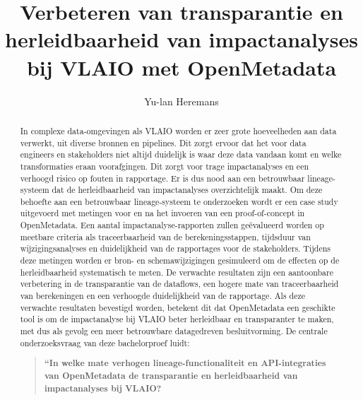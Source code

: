 \documentclass{hogent-article}
\title{Verbeteren van transparantie en herleidbaarheid van impactanalyses bij VLAIO met OpenMetadata}
\author{Yu-lan Heremans}
\begin{document}
\begin{abstract}
In complexe data-omgevingen als VLAIO worden er zeer grote hoeveelheden aan data verwerkt, uit diverse bronnen en pipelines. Dit zorgt ervoor dat het voor data engineers en stakeholders niet altijd duidelijk is waar deze data vandaan komt en welke transformaties eraan voorafgingen. Dit zorgt voor trage impactanalyses en een verhoogd risico op fouten in rapportage. Er is dus nood aan een betrouwbaar lineage-systeem dat de herleidbaarheid van impactanalyses overzichtelijk maakt. 
Om deze behoefte aan een betrouwbaar lineage-systeem te onderzoeken wordt er een case study uitgevoerd met metingen voor en na het invoeren van een proof-of-concept in OpenMetadata. Een aantal impactanalyse-rapporten zullen geëvalueerd worden op meetbare criteria als traceerbaarheid van de berekeningsstappen, tijdsduur van wijzigingsanalyses en duidelijkheid van de rapportages voor de stakeholders. Tijdens deze metingen worden er bron- en schemawijzigingen gesimuleerd om de effecten op de herleidbaarheid systematisch te meten.
De verwachte resultaten zijn een aantoonbare verbetering in de transparantie van de dataflows, een hogere mate van traceerbaarheid van berekeningen en een verhoogde duidelijkheid van de rapportage.
Als deze verwachte resultaten bevestigd worden, betekent dit dat OpenMetadata een geschikte tool is om de impactanalyse bij VLAIO beter herleidbaar en transparanter te maken, met dus als gevolg een meer betrouwbare datagedreven besluitvorming.
De centrale onderzoeksvraag van deze bachelorproef luidt: 
\begin{quote}
\textbf{“In welke mate verhogen lineage-functionaliteit en API-integraties van OpenMetadata de transparantie en herleidbaarheid van impactanalyses bij VLAIO?}
\end{quote}
\end{abstract}

\tableofcontents



\printbibliography[heading=bibintoc]
\end{document}
